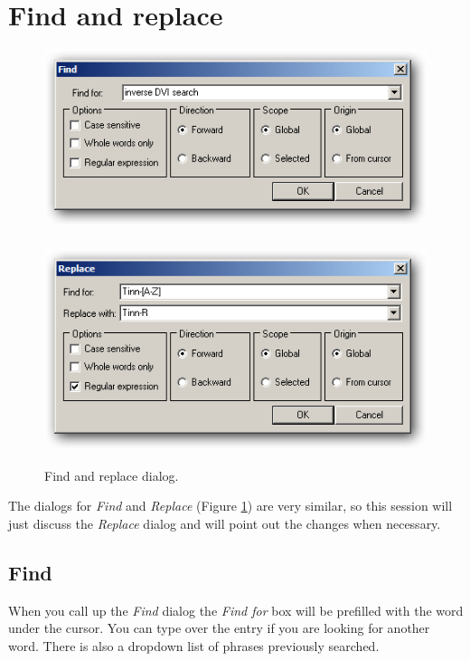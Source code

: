
\hypertarget{working_findreplace}{}
\section{Find and replace}

\begin{figure}[h!]
  \includegraphics[scale=0.35]{./res/find.png}~~
  \includegraphics[scale=0.35]{./res/replace.png}\\
  \caption{Find and replace dialog.}
  \label{fig:find_replace}
\end{figure}

The dialogs for \textit{Find}
and \textit{Replace}
(Figure \ref{fig:find_replace})
are very similar, so this session will just discuss the \textit{Replace} dialog
and will point out the changes when necessary.


\subsection{Find}

When you call up the \textit{Find} dialog
the \textit{Find for} box will be
prefilled with the word under the cursor. You can type over the entry if you
are looking for another word. There is also a dropdown list of phrases
previously searched.


